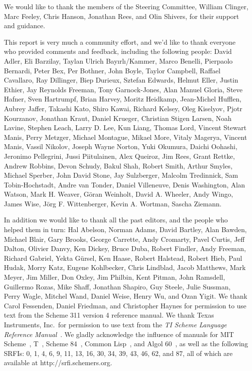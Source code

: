 We would like to thank the members of the Steering Committee, William
Clinger, Marc Feeley, Chris Hanson, Jonathan Rees, and Olin Shivers, for
their support and guidance.

This report is very much a community effort, and we'd like to
thank everyone who provided comments and feedback, including
the following people: David Adler, Eli Barzilay, Taylan Ulrich
Bay\i{}rl\i/Kammer, Marco Benelli, Pierpaolo Bernardi,
Peter Bex, Per Bothner, John Boyle, Taylor Campbell, Raffael Cavallaro,
Ray Dillinger, Biep Durieux, Sztefan Edwards, Helmut Eller, Justin
Ethier, Jay Reynolds Freeman, Tony Garnock-Jones, Alan Manuel Gloria,
Steve Hafner, Sven Hartrumpf, Brian Harvey, Moritz Heidkamp, Jean-Michel
Hufflen, Aubrey Jaffer, Takashi Kato, Shiro Kawai, Richard Kelsey, Oleg
Kiselyov, Pjotr Kourzanov, Jonathan Kraut, Daniel Krueger, Christian
Stigen Larsen, Noah Lavine, Stephen Leach, Larry D. Lee, Kun Liang,
Thomas Lord, Vincent Stewart Manis, Perry Metzger, Michael Montague,
Mikael More, Vitaly Magerya, Vincent Manis, Vassil Nikolov, Joseph
Wayne Norton, Yuki Okumura, Daichi Oohashi, Jeronimo Pellegrini, Jussi
Piitulainen, Alex Queiroz, Jim Rees, Grant Rettke, Andrew Robbins, Devon
Schudy, Bakul Shah, Robert Smith, Arthur Smyles, Michael Sperber, John
David Stone, Jay Sulzberger, Malcolm Tredinnick, Sam Tobin-Hochstadt,
Andre van Tonder, Daniel Villeneuve, Denis Washington, Alan Watson,
Mark H.  Weaver, G\"oran Weinholt, David A. Wheeler, Andy Wingo, James
Wise, J\"org F. Wittenberger, Kevin A. Wortman, Sascha Ziemann.

In addition we would like to thank all the past editors, and the
people who helped them in turn: Hal Abelson, Norman Adams, David
Bartley, Alan Bawden, Michael Blair, Gary Brooks, George Carrette,
Andy Cromarty, Pavel Curtis, Jeff Dalton, Olivier Danvy, Ken Dickey,
Bruce Duba, Robert Findler, Andy Freeman, Richard Gabriel, Yekta
G\"ursel, Ken Haase, Robert Halstead, Robert Hieb, Paul Hudak, Morry
Katz, Eugene Kohlbecker, Chris Lindblad, Jacob Matthews, Mark Meyer,
Jim Miller, Don Oxley, Jim Philbin, Kent Pitman, John Ramsdell,
Guillermo Rozas, Mike Shaff, Jonathan Shapiro, Guy Steele, Julie
Sussman, Perry Wagle, Mitchel Wand, Daniel Weise, Henry Wu, and Ozan
Yigit.  We thank Carol Fessenden, Daniel Friedman, and Christopher
Haynes for permission to use text from the Scheme 311 version 4
reference manual.  We thank Texas Instruments, Inc.~for permission to
use text from the {\em TI Scheme Language Reference
Manual}~\cite{TImanual85}.  We gladly acknowledge the influence of
manuals for MIT Scheme~\cite{MITScheme}, T~\cite{Rees84}, Scheme
84~\cite{Scheme84}, Common Lisp~\cite{CLtL}, and Algol 60~\cite{Naur63},
as well as the following SRFIs:  0, 1, 4, 6, 9, 11, 13, 16, 30, 34, 39, 43, 46, 62, and 87,
all of which are available at {\cf http://srfi.schemers.org}.

